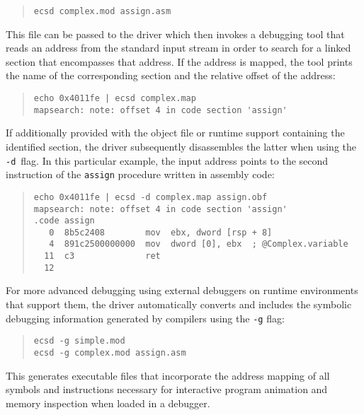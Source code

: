 \begin{quote}\begin{verbatim}
ecsd complex.mod assign.asm
\end{verbatim}\end{quote}

This file can be passed to the driver which then invokes a debugging tool that reads an address from the standard input stream in order to search for a linked section that encompasses that address.
If the address is mapped, the tool prints the name of the corresponding section and the relative offset of the address:

\begin{quote}\begin{verbatim}
echo 0x4011fe | ecsd complex.map
mapsearch: note: offset 4 in code section 'assign'
\end{verbatim}\end{quote}

If additionally provided with the object file or runtime support containing the identified section, the driver subsequently disassembles the latter when using the \texttt{-d}~flag.
In this particular example, the input address points to the second instruction of the \texttt{assign} procedure written in assembly code:

\begin{quote}\begin{verbatim}
echo 0x4011fe | ecsd -d complex.map assign.obf
mapsearch: note: offset 4 in code section 'assign'
.code assign
   0  8b5c2408        mov  ebx, dword [rsp + 8]
   4  891c2500000000  mov  dword [0], ebx  ; @Complex.variable
  11  c3              ret
  12
\end{verbatim}\end{quote}

For more advanced debugging using external debuggers on runtime environments that support them, the \ecs{} driver automatically converts and includes the symbolic debugging information generated by compilers using the \texttt{-g} flag:

\begin{quote}\begin{verbatim}
ecsd -g simple.mod
ecsd -g complex.mod assign.asm
\end{verbatim}\end{quote}

This generates executable files that incorporate the address mapping of all symbols and instructions necessary for interactive program animation and memory inspection when loaded in a debugger.

\concludechapter
